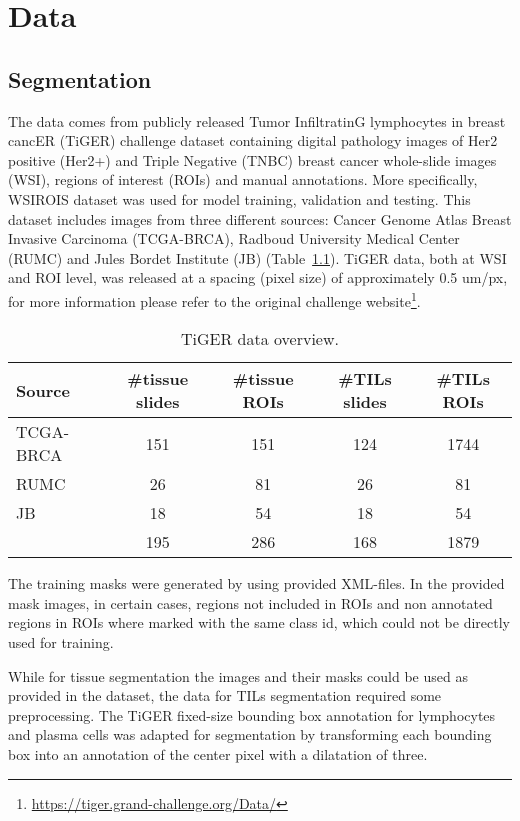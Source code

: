 \chapter{Data}
\section{Segmentation}
The data comes from publicly released Tumor InfiltratinG lymphocytes in
breast cancER (TiGER) challenge dataset containing
digital pathology images of Her2 positive (Her2+) and Triple Negative (TNBC) breast
cancer whole-slide images (WSI), regions of interest (ROIs) and manual annotations. More specifically, WSIROIS dataset
was used for model training, validation and testing. This dataset includes images from three different sources:
Cancer Genome Atlas Breast Invasive Carcinoma (TCGA-BRCA),
Radboud University Medical Center (RUMC) and Jules Bordet Institute (JB) (Table~\ref*{tab:segm_data}).
TiGER data, both at WSI and ROI level, was released at a spacing (pixel size) of approximately 0.5 um/px,
for more information please refer to the original challenge
website\footnote{\url{https://tiger.grand-challenge.org/Data/}}.
\begin{table}[h!]
\centering
\begin{tabular}{ l c c c c } 
\hline
Source & \#tissue slides & \#tissue ROIs & \#TILs slides & \#TILs ROIs \\ 
\hline
TCGA-BRCA & 151 & 151 & 124 & 1744 \\ 
RUMC & 26 & 81 & 26 & 81 \\ 
JB & 18 & 54 & 18 & 54\\
\hline
 & 195 & 286 & 168 & 1879\\
\end{tabular}
\caption{\label{tab:segm_data}TiGER data overview.}
\end{table}
The training masks were generated by using provided XML-files. In the provided mask
images, in certain cases, regions not included in ROIs and non annotated regions in ROIs where
marked with the same class id, which could not be directly used for training.

While for tissue segmentation the images and their masks could be used as provided in the 
dataset, the data for TILs segmentation required some preprocessing. The TiGER fixed-size bounding box
annotation for lymphocytes and plasma cells was adapted for segmentation by transforming each
bounding box into an annotation of the center pixel with a dilatation of three.

